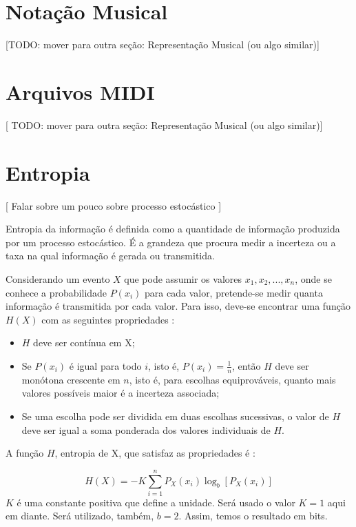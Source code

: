 \section{Notação Musical}

[TODO: mover para outra seção: Representação Musical (ou algo similar)]

\section{Arquivos MIDI}

[ TODO: mover para outra seção: Representação Musical (ou algo similar)]



\section{Entropia}

[ Falar sobre um pouco sobre processo estocástico ]

Entropia da informação é definida como a quantidade de informação produzida por um processo estocástico. É a grandeza que procura medir a incerteza ou a taxa na qual informação é gerada ou transmitida.

Considerando um evento $X$ que pode assumir os valores ${x_1, x_2, ..., x_n}$, onde se conhece a probabilidade $P(x_i)$ para cada valor, pretende-se medir quanta informação é transmitida por cada valor. Para isso, deve-se encontrar uma função $H(X)$ com as seguintes propriedades \cite{shannon}:

\begin{itemize}
    \item $H$ deve ser contínua em X;
    \item Se $P(x_i)$ é igual para todo $i$, isto é, $P(x_i) = \frac{1}{n}$, então $H$ deve ser monótona crescente em $n$, isto é, para escolhas equiprováveis, quanto mais valores possíveis maior é a incerteza associada;
    \item Se uma escolha pode ser dividida em duas escolhas sucessivas, o valor de $H$ deve ser igual a soma ponderada dos valores individuais de $H$. 
\end{itemize}

A função $H$, entropia de X, que satisfaz as propriedades é \cite{shannon}:

\begin{equation}
    H(X) = - K \sum_{i=1}^{n} P_X(x_i) \log_b{[P_X(x_i)]}
\end{equation}
$K$ é uma constante positiva que define a unidade. Será usado o valor $K=1$ aqui em diante. Será utilizado, também, $b=2$. Assim, temos o resultado em bits.

